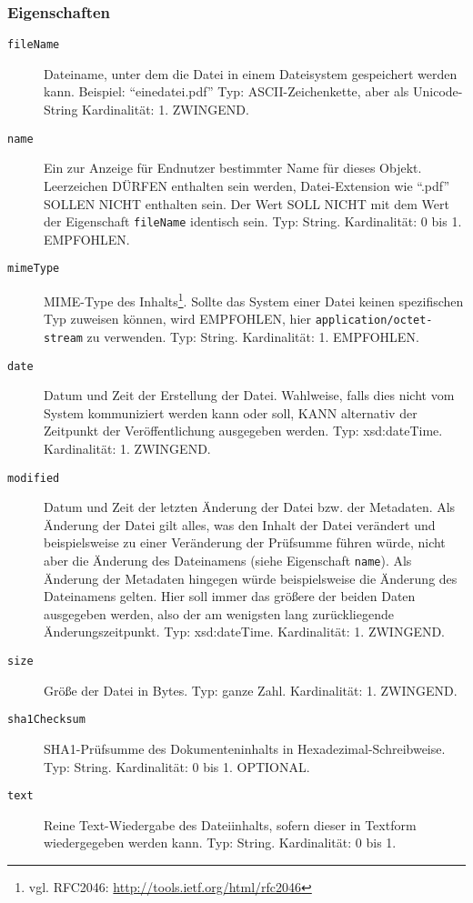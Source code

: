 \documentclass[,a4paper]{article}
\begin{document}
\subsubsection{Eigenschaften}\label{eigenschaften-7}

\begin{description}
\item[\texttt{fileName}]
Dateiname, unter dem die Datei in einem Dateisystem gespeichert werden
kann. Beispiel: ``einedatei.pdf'' Typ: ASCII-Zeichenkette, aber als
Unicode-String Kardinalität: 1. ZWINGEND.
\item[\texttt{name}]
Ein zur Anzeige für Endnutzer bestimmter Name für dieses Objekt.
Leerzeichen DÜRFEN enthalten sein werden, Datei-Extension wie ``.pdf''
SOLLEN NICHT enthalten sein. Der Wert SOLL NICHT mit dem Wert der
Eigenschaft \texttt{fileName} identisch sein. Typ: String. Kardinalität:
0 bis 1. EMPFOHLEN.
\item[\texttt{mimeType}]
MIME-Type des Inhalts\footnote{vgl. RFC2046:
  \url{http://tools.ietf.org/html/rfc2046}}. Sollte das System einer
Datei keinen spezifischen Typ zuweisen können, wird EMPFOHLEN, hier
\texttt{application/octet-stream} zu verwenden. Typ: String.
Kardinalität: 1. EMPFOHLEN.
\item[\texttt{date}]
Datum und Zeit der Erstellung der Datei. Wahlweise, falls dies nicht vom
System kommuniziert werden kann oder soll, KANN alternativ der Zeitpunkt
der Veröffentlichung ausgegeben werden. Typ: xsd:dateTime. Kardinalität:
1. ZWINGEND.
\item[\texttt{modified}]
Datum und Zeit der letzten Änderung der Datei bzw. der Metadaten. Als
Änderung der Datei gilt alles, was den Inhalt der Datei verändert und
beispielsweise zu einer Veränderung der Prüfsumme führen würde, nicht
aber die Änderung des Dateinamens (siehe Eigenschaft \texttt{name}). Als
Änderung der Metadaten hingegen würde beispielsweise die Änderung des
Dateinamens gelten. Hier soll immer das größere der beiden Daten
ausgegeben werden, also der am wenigsten lang zurückliegende
Änderungszeitpunkt. Typ: xsd:dateTime. Kardinalität: 1. ZWINGEND.
\item[\texttt{size}]
Größe der Datei in Bytes. Typ: ganze Zahl. Kardinalität: 1. ZWINGEND.
\item[\texttt{sha1Checksum}]
SHA1-Prüfsumme des Dokumenteninhalts in Hexadezimal-Schreibweise. Typ:
String. Kardinalität: 0 bis 1. OPTIONAL.
\item[\texttt{text}]
Reine Text-Wiedergabe des Dateiinhalts, sofern dieser in Textform
wiedergegeben werden kann. Typ: String. Kardinalität: 0 bis 1.

\end{description}
\end{document}
